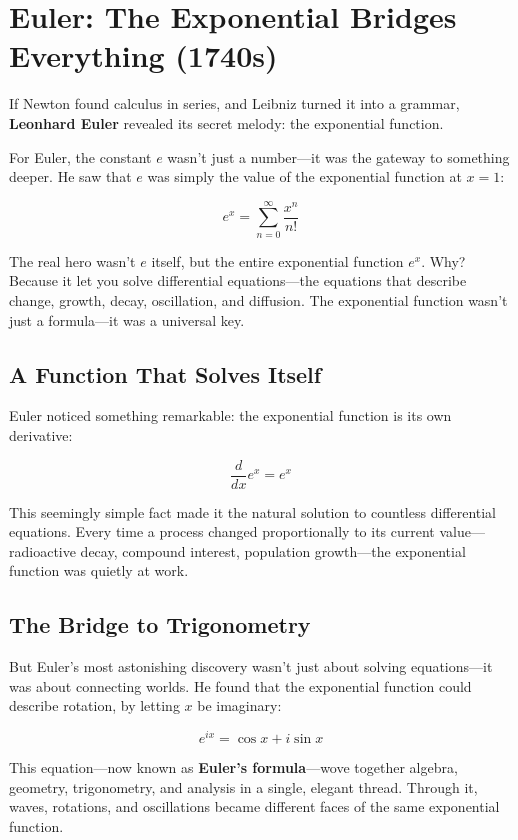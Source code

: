 \section{Euler: The Exponential Bridges Everything (1740s)}

If Newton found calculus in series, and Leibniz turned it into a grammar, \textbf{Leonhard Euler} revealed its secret melody: the exponential function.

For Euler, the constant \( e \) wasn’t just a number—it was the gateway to something deeper. He saw that \( e \) was simply the value of the exponential function at \( x = 1 \):

\[
e^x = \sum_{n=0}^{\infty} \frac{x^n}{n!}
\]

The real hero wasn’t \( e \) itself, but the entire exponential function \( e^x \). Why? Because it let you solve differential equations—the equations that describe change, growth, decay, oscillation, and diffusion. The exponential function wasn’t just a formula—it was a universal key.

\vspace{1em}

\subsection{A Function That Solves Itself}

Euler noticed something remarkable: the exponential function is its own derivative:

\[
\frac{d}{dx} e^x = e^x
\]

This seemingly simple fact made it the natural solution to countless differential equations. Every time a process changed proportionally to its current value—radioactive decay, compound interest, population growth—the exponential function was quietly at work.

\vspace{1em}

\subsection{The Bridge to Trigonometry}

But Euler’s most astonishing discovery wasn’t just about solving equations—it was about connecting worlds. He found that the exponential function could describe rotation, by letting \( x \) be imaginary:

\[
e^{ix} = \cos x + i \sin x
\]

This equation—now known as \textbf{Euler’s formula}—wove together algebra, geometry, trigonometry, and analysis in a single, elegant thread. Through it, waves, rotations, and oscillations became different faces of the same exponential function.

